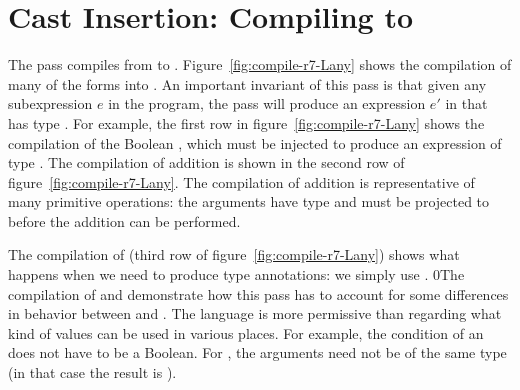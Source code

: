 \documentclass[7x10]{TimesAPriori_MIT}%
\def\racketEd{0}
\def\edition{1}
\newcommand{\racket}[1]{{\if\edition\racketEd{#1}\fi}}
\numberwithin{theorem}{chapter}
\numberwithin{definition}{chapter}
\numberwithin{equation}{chapter}
\begin{document}
\clearpage

\section{Cast Insertion: Compiling \LangDyn{} to \LangAny{}}
\label{sec:compile-r7}

The  pass compiles from \LangDyn{} to \LangAny{}.
Figure~\ref{fig:compile-r7-Lany} shows the compilation of many of the
\LangDyn{} forms into \LangAny{}. An important invariant of this pass
is that given any subexpression $e$ in the \LangDyn{} program, the
pass will produce an expression $e'$ in \LangAny{} that has type
\ANYTY{}. For example, the first row in
figure~\ref{fig:compile-r7-Lany} shows the compilation of the Boolean
\TRUE{}, which must be injected to produce an expression of type
\ANYTY{}.
%
The compilation of addition is shown in the second row of
figure~\ref{fig:compile-r7-Lany}. The compilation of addition is
representative of many primitive operations: the arguments have type
\ANYTY{} and must be projected to \INTTYPE{} before the addition can
be performed.

The compilation of  (third row of
figure~\ref{fig:compile-r7-Lany}) shows what happens when we need to
produce type annotations: we simply use \ANYTY{}.
%
\racket{The compilation of  and   demonstrate how
  this pass has to account for some differences in behavior between
  \LangDyn{} and \LangAny{}. The \LangDyn{} language is more
  permissive than \LangAny{} regarding what kind of values can be used
  in various places. For example, the condition of an \key{if} does
  not have to be a Boolean. For \key{eq?}, the arguments need not be
  of the same type (in that case the result is \code{\#f}).}
\end{document}
